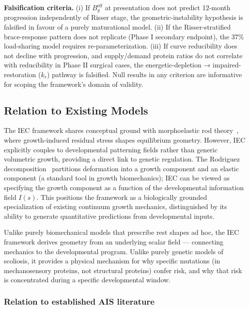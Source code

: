 \textbf{Falsification criteria.}
(i) If $B_g^{\mathrm{eff}}$ at presentation does not predict 12-month progression independently of Risser stage, the geometric-instability hypothesis is falsified in favour of a purely maturational model. (ii) If the Risser-stratified brace-response pattern does not replicate (Phase I secondary endpoint), the 37\% load-sharing model requires re-parameterization. (iii) If curve reducibility does not decline with progression, and supply/demand protein ratios do not correlate with reducibility in Phase II surgical cases, the energetic-depletion → impaired-restoration ($k_r$) pathway is falsified. Null results in any criterion are informative for scoping the framework's domain of validity.

\subsection{Relation to Existing Models}


The IEC framework shares conceptual ground with morphoelastic rod theory~\cite{moulton2013morphoelastic}, where growth-induced residual stress shapes equilibrium geometry. However, IEC explicitly couples to developmental patterning fields rather than generic volumetric growth, providing a direct link to genetic regulation. The Rodriguez decomposition~\cite{rodriguez1994stress} partitions deformation into a growth component and an elastic component (a standard tool in growth biomechanics); IEC can be viewed as specifying the growth component as a function of the developmental information field $I(s)$. This positions the framework as a biologically grounded specialization of existing continuum growth mechanics, distinguished by its ability to generate quantitative predictions from developmental inputs.

Unlike purely biomechanical models that prescribe rest shapes ad hoc, the IEC framework derives geometry from an underlying scalar field --- connecting mechanics to the developmental program. Unlike purely genetic models of scoliosis, it provides a physical mechanism for why specific mutations (in mechanosensory proteins, not structural proteins) confer risk, and why that risk is concentrated during a specific developmental window.

\subsubsection*{Relation to established AIS literature}

